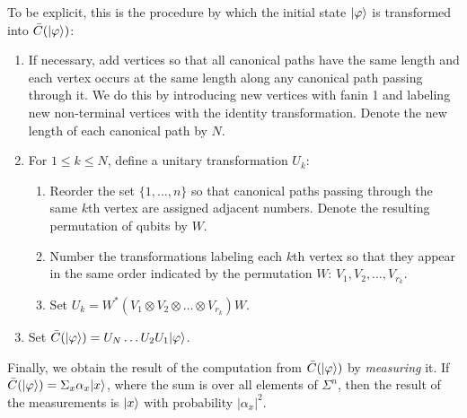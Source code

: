 To be explicit, this is the procedure by which the initial state $|\varphi\rangle$
is transformed into $\bar C(|\varphi\rangle)$:
\begin{enumerate}
\item If necessary, add vertices so that all canonical paths have the same
  length and each vertex occurs at the same length along any canonical path
  passing through it. We do this by introducing new vertices with fanin 1 and
  labeling new non-terminal vertices with the identity transformation. Denote
  the new length of each canonical path by $N$.
\item For $1\leq k\leq N$, define a unitary transformation $U_k$:
  \begin{enumerate}
  \item Reorder the set $\{1,\ldots,n\}$ so that canonical paths passing
    through the same $k$th vertex are assigned adjacent numbers. Denote the
    resulting permutation of qubits by $W$.
  \item Number the transformations labeling each $k$th vertex so that they
    appear in the same order indicated by the permutation $W$:
    $V_1,V_2,\ldots,V_{r_k}$.
  \item Set $U_k=W^*(V_1\otimes V_2\otimes\ldots\otimes V_{r_k})W$.
  \end{enumerate}
\item Set $\bar C(|\varphi\rangle)=U_N\ldots U_2U_1|\varphi\rangle$.
\end{enumerate}
Finally, we obtain the result of the computation from $\bar C(|\varphi\rangle)$ by
\textit{measuring} it. If $\bar C(|\varphi\rangle)=\Sigma_x\alpha_x|x\rangle$, where
the sum is over all elements of $\Sigma^n$, then the result of the measurements
is $|x\rangle$ with probability $|\alpha_x|^2$.

